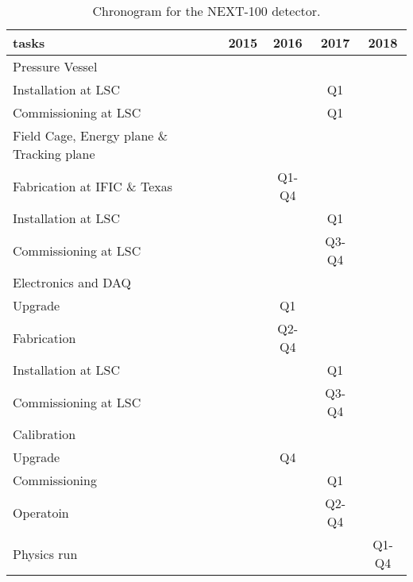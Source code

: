 \begin{table}[h!]
\begin{center}
\begin{tabular}{| l | c | c | c | c |}
\hline
tasks & 2015 & 2016 & 2017 & 2018 \\
\hline
Pressure Vessel & & & &   \\
\hline
Installation at LSC &  & & Q1& \\
Commissioning at LSC & & &Q1 & \\
\hline
Field Cage, Energy plane \& Tracking plane & & & &  \\
\hline
Fabrication at IFIC \& Texas & & Q1-Q4 & & \\
Installation at LSC &  & &Q1 & \\
Commissioning at LSC &  & & Q3-Q4& \\
\hline
Electronics and DAQ & & & &   \\
\hline
Upgrade & & Q1 & & \\
Fabrication & & Q2-Q4 & & \\
Installation at LSC & & & Q1& \\
Commissioning at LSC & & & Q3-Q4 & \\
\hline
Calibration & & & &   \\
\hline
Upgrade & & Q4& & \\
Commissioning & & & Q1 & \\
Operatoin & & & Q2-Q4 & \\
\hline
Physics run & & & &  Q1-Q4 \\
\hline
\end{tabular}
\caption{Chronogram for the NEXT-100 detector.}
\label{tab:schedule_next}
\end{center}
\end{table} 
